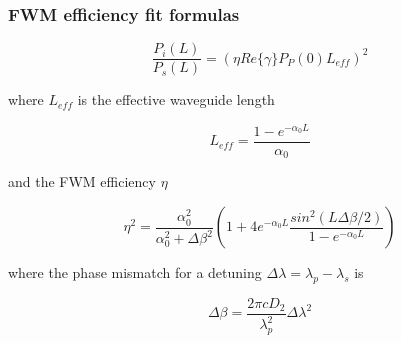 \documentclass{beamer}
\begin{document}
\begin{frame}
 \frametitle{FWM efficiency fit formulas}

\begin{equation}
	\frac{P_i(L)}{P_s(L)}=(\eta Re\{\gamma\}P_P(0)L_{eff})^2 
\end{equation}

where $ L_{eff} $ is the effective waveguide length

\begin{equation}
	L_{eff}=\frac{1-e^{-\alpha_0L}}{\alpha_0}
\end{equation}

and the FWM efficiency $ \eta $

\begin{equation}
	\eta ^2=\frac{\alpha_0^2}{\alpha_0^2+\Delta \beta^2}\left( 1+ 4e^{-\alpha_0L}\frac{sin^2(L\Delta\beta/2)}{1-e^{-\alpha_0L}} \right)
\end{equation}

where the phase mismatch for a detuning $ \Delta\lambda = \lambda_p-\lambda_s$ is

\begin{equation}
	\Delta \beta=\frac{2\pi cD_2}{\lambda_p^2}\Delta\lambda^2
\end{equation}


\end{frame}
\end{document}
